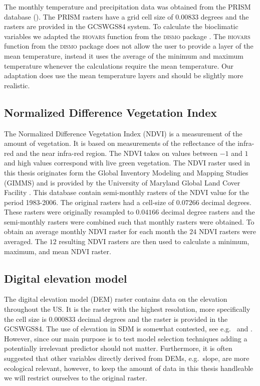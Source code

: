 The monthly temperature and precipitation data was obtained from the PRISM database (\citeauthor{PRISM}). The PRISM rasters have a grid cell size of $0.00833$ degrees and the rasters are provided in the GCS\textunderscore WGS84 system. To calculate the bioclimatic variables we adapted the \textsc{biovars} function from the \textsc{dismo} package \parencite{dismo}. The \textsc{biovars} function from the \textsc{dismo} package does not allow the user to provide a layer of the mean temperature, instead it uses the average of the minimum and maximum temperature whenever the calculations require the mean temperature. Our adaptation does use the mean temperature layers and should be slightly more realistic.

\subsection{Normalized Difference Vegetation Index}
The Normalized Difference Vegetation Index (NDVI) is a measurement of the amount of vegetation. It is based on measurements of the reflectance of the infra-red and the near infra-red region. The NDVI takes on values between $-1$ and $1$ and high values correspond with live green vegetation. The NDVI raster used in this thesis originates form the Global Inventory Modeling and Mapping Studies (GIMMS) and is provided by the University of Maryland Global Land Cover Facility \parencite{pinzon2005satellite, tucker2005extended}. This database contain semi-monthly rasters of the NDVI value for the period 1983-2006. The original rasters had a cell-size of $0.07266$ decimal degrees. These rasters were originally  resampled to $0.04166$ decimal degree rasters and the semi-monthly rasters were combined such that monthly rasters were obtained. To obtain an average monthly NDVI raster for each month the $24$ NDVI rasters were averaged. The $12$ resulting NDVI rasters are then used to calculate a minimum, maximum, and mean NDVI raster.

\subsection{Digital elevation model}
The digital elevation model (DEM) raster \parencite{DEM} contains data on the elevation throughout the US. It is the raster with the highest resolution, more specifically the cell size is $0.000833$ decimal degrees and the raster is provided in the GCS\textunderscore WGS84. The use of elevation in SDM is somewhat contested, see e.g.\ \cite{hof_usefulness_2012} and \cite{oke_distribution_2015}. However, since our main purpose is to test model selection techniques adding a potentially irrelevant predictor should not matter. Furthermore, it is often suggested that other variables directly derived from DEMs, e.g.\ slope, are more ecological relevant, however, to keep the amount of data in this thesis handleable we will restrict ourselves to the original raster.


